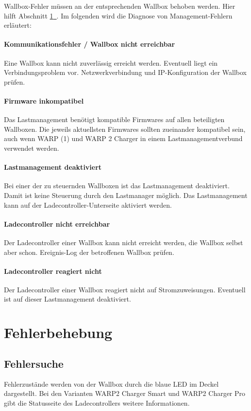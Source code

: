 \documentclass[a4paper,10pt]{article}
\newcommand*{\fullref}[1]{\hyperref[{#1}]{\ref*{#1}~\nameref*{#1}}}
\begin{document}
\begin{multicols*}{2}
	Wallbox-Fehler müssen an der entsprechenden Wallbox behoben werden. Hier hilft Abschnitt \fullref{fehlerbehebung}. Im folgenden wird die Diagnose von Management-Fehlern erläutert:

	\paragraph{Kommunikationsfehler / Wallbox nicht erreichbar}
	Eine Wallbox kann nicht zuverlässig erreicht werden. Eventuell liegt ein Verbindungsproblem vor. Netzwerkverbindung und IP-Konfiguration der Wallbox prüfen.

	\paragraph{Firmware inkompatibel}
	Das Lastmanagement benötigt kompatible Firmwares auf allen beteiligten Wallboxen. Die jeweils aktuellsten Firmwares sollten zueinander kompatibel sein,
	auch wenn WARP (1) und WARP 2 Charger in einem Lastmanagementverbund verwendet werden.

	\paragraph{Lastmanagement deaktiviert}
	Bei einer der zu steuernden Wallboxen ist das Lastmanagement deaktiviert. Damit ist keine Steuerung durch den Lastmanager möglich. Das Lastmanagement kann auf der Ladecontroller-Unterseite aktiviert werden.

	\paragraph{Ladecontroller nicht erreichbar}
	Der Ladecontroller einer Wallbox kann nicht erreicht werden, die Wallbox selbst aber schon. Ereignis-Log der betroffenen Wallbox prüfen.

	\paragraph{Ladecontroller reagiert nicht}
	Der Ladecontroller einer Wallbox reagiert nicht auf Stromzuweisungen. Eventuell ist auf dieser Lastmanagement deaktiviert.

	\newpage \section{Fehlerbehebung}\label{fehlerbehebung} \subsection{Fehlersuche}
	Fehlerzustände werden von der Wallbox durch die blaue LED im Deckel
	dargestellt. Bei den Varianten WARP2 Charger Smart und WARP2 Charger Pro gibt die Statusseite des Ladecontrollers
	weitere Informationen.


\end{multicols*}
\end{document}

